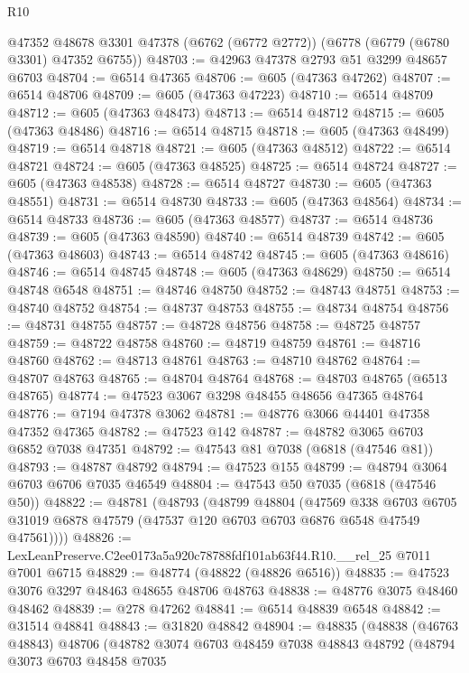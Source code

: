 \begin{lexlean}{R10}
\begin{coremodule}
    @47352
    @48678
    @3301
    @47378
    (@6762 (@6772 @2772))
    (@6778 (@6779 (@6780 @3301) @47352 @6755))
@48703 := @42963 @47378 @2793 @51 @3299 @48657 @6703
@48704 := @6514 @47365
@48706 := @605 (@47363 @47262)
@48707 := @6514 @48706
@48709 := @605 (@47363 @47223)
@48710 := @6514 @48709
@48712 := @605 (@47363 @48473)
@48713 := @6514 @48712
@48715 := @605 (@47363 @48486)
@48716 := @6514 @48715
@48718 := @605 (@47363 @48499)
@48719 := @6514 @48718
@48721 := @605 (@47363 @48512)
@48722 := @6514 @48721
@48724 := @605 (@47363 @48525)
@48725 := @6514 @48724
@48727 := @605 (@47363 @48538)
@48728 := @6514 @48727
@48730 := @605 (@47363 @48551)
@48731 := @6514 @48730
@48733 := @605 (@47363 @48564)
@48734 := @6514 @48733
@48736 := @605 (@47363 @48577)
@48737 := @6514 @48736
@48739 := @605 (@47363 @48590)
@48740 := @6514 @48739
@48742 := @605 (@47363 @48603)
@48743 := @6514 @48742
@48745 := @605 (@47363 @48616)
@48746 := @6514 @48745
@48748 := @605 (@47363 @48629)
@48750 := @6514 @48748 @6548
@48751 := @48746 @48750
@48752 := @48743 @48751
@48753 := @48740 @48752
@48754 := @48737 @48753
@48755 := @48734 @48754
@48756 := @48731 @48755
@48757 := @48728 @48756
@48758 := @48725 @48757
@48759 := @48722 @48758
@48760 := @48719 @48759
@48761 := @48716 @48760
@48762 := @48713 @48761
@48763 := @48710 @48762
@48764 := @48707 @48763
@48765 := @48704 @48764
@48768 := @48703 @48765 (@6513 @48765)
@48774 := @47523 @3067 @3298 @48455 @48656 @47365 @48764
@48776 := @7194 @47378 @3062
@48781 := @48776 @3066 @44401 @47358 @47352 @47365
@48782 := @47523 @142
@48787 := @48782 @3065 @6703 @6852 @7038 @47351
@48792 := @47543 @81 @7038 (@6818 (@47546 @81))
@48793 := @48787 @48792
@48794 := @47523 @155
@48799 := @48794 @3064 @6703 @6706 @7035 @46549
@48804 := @47543 @50 @7035 (@6818 (@47546 @50))
@48822 := @48781
    (@48793
      (@48799
        @48804
        (@47569
          @338
          @6703
          @6705
          @31019
          @6878
          @47579
          (@47537 @120 @6703 @6703 @6876 @6548 @47549 @47561))))
@48826 := LexLeanPreserve.C2ee0173a5a920c78788fdf101ab63f44.R10.__rel_25 @7011 @7001 @6715
@48829 := @48774 (@48822 (@48826 @6516))
@48835 := @47523 @3076 @3297 @48463 @48655 @48706 @48763
@48838 := @48776 @3075 @48460 @48462
@48839 := @278 @47262
@48841 := @6514 @48839 @6548
@48842 := @31514 @48841
@48843 := @31820 @48842
@48904 := @48835
    (@48838
      (@46763 @48843)
      @48706
      (@48782
        @3074
        @6703
        @48459
        @7038
        @48843
        @48792
        (@48794
          @3073
          @6703
          @48458
          @7035

\end{coremodule}
\end{lexlean}
